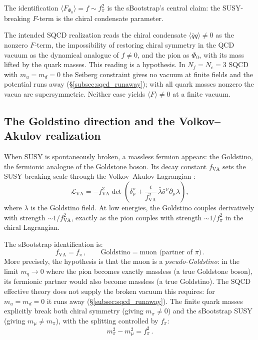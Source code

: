 \documentclass[12pt,a4paper]{article}
\newcommand{\fpi}{f_\pi}
\newcommand{\qqbar}{\langle\bar{q}q\rangle}
\begin{document}
The identification $\langle F_{\Phi_0}\rangle = f \sim \fpi^2$ is the
sBootstrap's central claim: the SUSY-breaking $F$-term is the chiral
condensate parameter.

The intended SQCD realization reads the chiral condensate
$\qqbar \neq 0$ as the nonzero $F$-term, the impossibility of
restoring chiral symmetry in the QCD vacuum as the dynamical analogue
of $f \neq 0$, and the pion as $\Phi_0$, with its mass lifted by the
quark masses. This reading is a hypothesis. In $N_f = N_c = 3$ SQCD
with $m_u = m_d = 0$ the Seiberg constraint gives no vacuum at finite
fields and the potential runs away (\S\ref{subsec:sqcd_runaway}); with
all quark masses nonzero the vacua are supersymmetric. Neither case
yields $\langle F\rangle \neq 0$ at a finite vacuum.

\subsection{The Goldstino direction and the Volkov--Akulov realization}
\label{subsec:va}

When SUSY is spontaneously broken, a massless fermion appears: the 
Goldstino, the fermionic analogue of the Goldstone boson. Its decay 
constant $f_{\text{VA}}$ sets the SUSY-breaking scale through the 
Volkov--Akulov Lagrangian \cite{VolkovAkulov1973}:
\begin{equation}
\mathcal{L}_{\text{VA}} = -f_{\text{VA}}^2 \det\!\left(
\delta_\mu^\nu + \frac{i}{f_{\text{VA}}^2}\,\bar{\lambda}\bar{\sigma}^\nu
\partial_\mu\lambda\right),
\end{equation}
where $\lambda$ is the Goldstino field. At low energies, the Goldstino 
couples derivatively with strength $\sim 1/f_{\text{VA}}^2$, exactly 
as the pion couples with strength $\sim 1/f_\pi^2$ in the chiral 
Lagrangian.

The sBootstrap identification is:
\begin{equation}
f_{\text{VA}} = f_\pi\,, \qquad 
\text{Goldstino} = \text{muon (partner of }\pi\text{)}\,.
\end{equation}
More precisely, the hypothesis is that the muon is a
\emph{pseudo-Goldstino}: in the limit $m_q \to 0$ where the pion
becomes exactly massless (a true Goldstone boson), its fermionic
partner would also become massless (a true Goldstino). The SQCD
effective theory does not supply the broken vacuum this requires: for
$m_u = m_d = 0$ it runs away (\S\ref{subsec:sqcd_runaway}). The finite quark masses explicitly break both 
chiral symmetry (giving $m_\pi \neq 0$) and the sBootstrap SUSY 
(giving $m_\mu \neq m_\pi$), with the splitting controlled by 
$f_\pi$:
\begin{equation}
m_\pi^2 - m_\mu^2 = f_\pi^2\,.
\end{equation}
\end{document}
